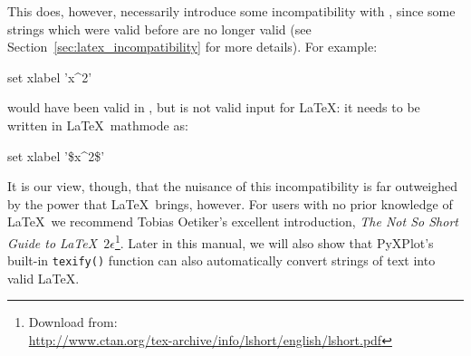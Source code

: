 This does, however, necessarily introduce some incompatibility with \gnuplot,
since some strings which were valid before are no longer valid (see
Section~\ref{sec:latex_incompatibility} for more details). For
example:

\begin{dontdo}
set xlabel 'x\^{}2'
\end{dontdo}

\noindent would have been valid in \gnuplot, but is not valid input for \LaTeX:
it needs to be written in \LaTeX\ mathmode as:

\begin{dodo}
set xlabel '\$x\^{}2\$'
\end{dodo}

\noindent It is our view, though, that the nuisance of this incompatibility is
far outweighed by the power that \LaTeX\ brings, however. For users with no
prior knowledge of \LaTeX\ we recommend Tobias Oetiker's
excellent introduction, {\it The Not So Short Guide to \LaTeX\
$2\epsilon$}\footnote{Download from:\\
\url{http://www.ctan.org/tex-archive/info/lshort/english/lshort.pdf}}. Later in
this manual, we will also show that PyXPlot's built-in  {\tt texify()} function
can also automatically convert strings of text into valid \LaTeX.

